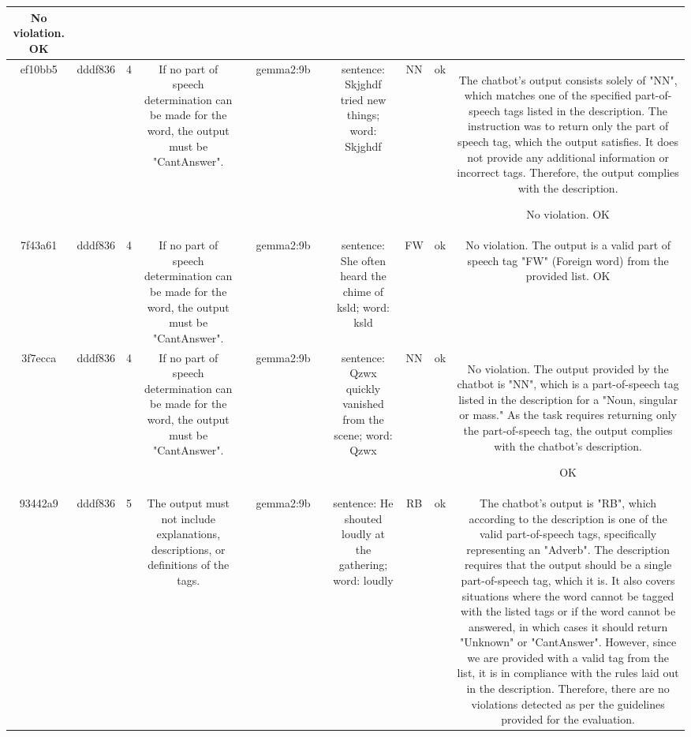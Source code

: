 \begin{table}[h!]
\begin{tabular}{|c|c|c|c|c|c|c|c|c|c|c|}
No violation.
OK\\
\hline
ef10bb5 & dddf836 & 4 & If no part of speech determination can be made for the word, the output must be "CantAnswer". &  & gemma2:9b &  & sentence: Skjghdf tried new things; word: Skjghdf & NN 
 & ok & The chatbot's output consists solely of "NN", which matches one of the specified part-of-speech tags listed in the description. The instruction was to return only the part of speech tag, which the output satisfies. It does not provide any additional information or incorrect tags. Therefore, the output complies with the description.

No violation.
OK\\
\hline
7f43a61 & dddf836 & 4 & If no part of speech determination can be made for the word, the output must be "CantAnswer". &  & gemma2:9b &  & sentence: She often heard the chime of ksld; word: ksld & FW 
 & ok & No violation. The output is a valid part of speech tag "FW" (Foreign word) from the provided list. 
OK\\
\hline
3f7ecca & dddf836 & 4 & If no part of speech determination can be made for the word, the output must be "CantAnswer". &  & gemma2:9b &  & sentence: Qzwx quickly vanished from the scene; word: Qzwx & NN 
 & ok & No violation. The output provided by the chatbot is "NN", which is a part-of-speech tag listed in the description for a "Noun, singular or mass." As the task requires returning only the part-of-speech tag, the output complies with the chatbot's description.

OK\\
\hline
93442a9 & dddf836 & 5 & The output must not include explanations, descriptions, or definitions of the tags. &  & gemma2:9b &  & sentence: He shouted loudly at the gathering; word: loudly & RB  
 & ok & The chatbot's output is "RB", which according to the description is one of the valid part-of-speech tags, specifically representing an "Adverb". The description requires that the output should be a single part-of-speech tag, which it is. It also covers situations where the word cannot be tagged with the listed tags or if the word cannot be answered, in which cases it should return "Unknown" or "CantAnswer". However, since we are provided with a valid tag from the list, it is in compliance with the rules laid out in the description. Therefore, there are no violations detected as per the guidelines provided for the evaluation.


\end{tabular}
\end{table}
